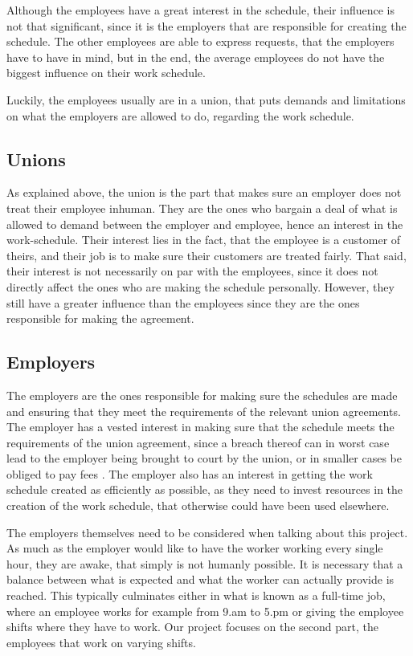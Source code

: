 Although the employees have a great interest in the schedule, their influence is not that significant, since it is the employers that are responsible for creating the schedule. The other employees are able to express requests, that the employers have to have in mind, \parencite{industriens_overenskomst} but in the end, the average employees do not have the biggest influence on their work schedule.

Luckily, the employees usually are in a union, that puts demands and limitations on what the employers are allowed to do, regarding the work schedule.  

\subsection{Unions}
As explained above, the union is the part that makes sure an employer does not treat their employee inhuman. They are the ones who bargain a deal of what is allowed to demand between the employer and employee, hence an interest in the work-schedule. Their interest lies in the fact, that the employee is a customer of theirs, and their job is to make sure their customers are treated fairly. That said, their interest is not necessarily on par with the employees, since it does not directly affect the ones who are making the schedule personally. However, they still have a greater influence than the employees since they are the ones responsible for making the agreement.

\subsection{Employers}
The employers are the ones responsible for making sure the schedules are made and ensuring that they meet the requirements of the relevant union agreements. The employer has a vested interest in making sure that the schedule meets the requirements of the union agreement, since a breach thereof can in worst case lead to the employer being brought to court by the union, or in smaller cases be obliged to pay fees \parencite{overenskomstbrud}. The employer also has an interest in getting the work schedule created as efficiently as possible, as they need to invest resources in the creation of the work schedule, that otherwise could have been used elsewhere. 

The employers themselves need to be considered when talking about this project. As much as the employer would like to have the worker working every single hour, they are awake, that simply is not humanly possible. It is necessary that a balance between what is expected and what the worker can actually provide is reached. This typically culminates either in what is known as a full-time job, where an employee works for example from 9.am to 5.pm or giving the employee shifts where they have to work. Our project focuses on the second part, the employees that work on varying shifts.  %

